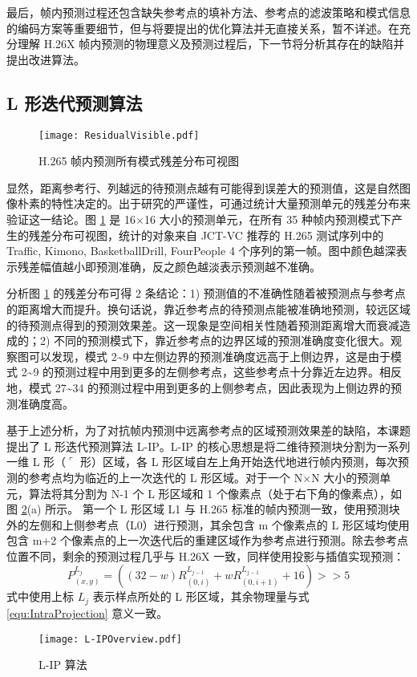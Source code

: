 最后，帧内预测过程还包含缺失参考点的填补方法、参考点的滤波策略和模式信息的编码方案等重要细节，但与将要提出的优化算法并无直接关系，暂不详述。在充分理解 H.26X 帧内预测的物理意义及预测过程后，下一节将分析其存在的缺陷并提出改进算法。

\subsection{L 形迭代预测算法}
\begin{figure}[hbt]
    \centering
    \texttt{[image: ResidualVisible.pdf]}
    \caption{H.265 帧内预测所有模式残差分布可视图}
    \label{fig:ResidualVisible}
\end{figure}
显然，距离参考行、列越远的待预测点越有可能得到误差大的预测值，这是自然图像朴素的特性决定的。出于研究的严谨性，可通过统计大量预测单元的残差分布来验证这一结论。图 \ref{fig:ResidualVisible} 是 16$\times$16 大小的预测单元，在所有 35 种帧内预测模式下产生的残差分布可视图，统计的对象来自 JCT-VC 推荐的 H.265 测试序列中的 Traffic, Kimono, BasketballDrill, FourPeople 4 个序列的第一帧。图中颜色越深表示残差幅值越小即预测准确，反之颜色越淡表示预测越不准确。

分析图 \ref{fig:ResidualVisible} 的残差分布可得 2 条结论：1) 预测值的不准确性随着被预测点与参考点的距离增大而提升。换句话说，靠近参考点的待预测点能被准确地预测，较远区域的待预测点得到的预测效果差。这一现象是空间相关性随着预测距离增大而衰减造成的；2) 不同的预测模式下，靠近参考点的边界区域的预测准确度变化很大。观察图可以发现，模式 2\textasciitilde9 中左侧边界的预测准确度远高于上侧边界，这是由于模式 2\textasciitilde9 的预测过程中用到更多的左侧参考点，这些参考点十分靠近左边界。相反地，模式 27\textasciitilde34 的预测过程中用到更多的上侧参考点，因此表现为上侧边界的预测准确度高。

基于上述分析，为了对抗帧内预测中远离参考点的区域预测效果差的缺陷，本课题提出了 L 形迭代预测算法 L-IP。L-IP 的核心思想是将二维待预测块分割为一系列一维 L 形（$\ulcorner$ 形）区域，各 L 形区域自左上角开始迭代地进行帧内预测，每次预测的参考点均为临近的上一次迭代的 L 形区域。对于一个 N$\times$N 大小的预测单元，算法将其分割为 N-1 个 L 形区域和 1 个像素点（处于右下角的像素点），如图 \ref{fig:L-IPOverview}(a) 所示。
第一个 L 形区域 L1 与 H.265 标准的帧内预测一致，使用预测块外的左侧和上侧参考点（L0）进行预测，其余包含 m 个像素点的 L 形区域均使用包含 m+2 个像素点的上一次迭代后的重建区域作为参考点进行预测。除去参考点位置不同，剩余的预测过程几乎与 H.26X 一致，同样使用投影与插值实现预测：
\begin{equation}
    P_{(x,y)}^{L_j} =((32-w)R_{(0,i)}^{L_{j-1}} +wR_{(0,i+1)}^{L_{j-1}} +16)>>5
    \label{equ:L-IP}
\end{equation}
式中使用上标 $L_j$ 表示样点所处的 L 形区域，其余物理量与式 \ref{equ:IntraProjection} 意义一致。
\begin{figure}[hbt]
    \centering
    \texttt{[image: L-IPOverview.pdf]}
    \caption{L-IP 算法}
    \label{fig:L-IPOverview}
\end{figure}

